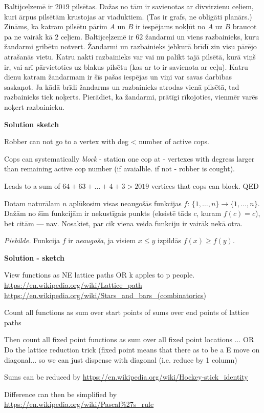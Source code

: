 \begin{problem}
Baltijceļzemē ir $2019$ pilsētas. Dažas no tām ir savienotas ar divvirzienu ceļiem, kuri ārpus pilsētām krustojas ar viaduktiem. (Tas ir grafs, ne obligāti planārs.)  
Zināms, ka katram pilsētu pārim $A$ un $B$ ir iespējams nokļūt no $A$ uz $B$ braucot pa ne vairāk kā $2$ ceļiem.
Baltijceļzemē ir $62$ žandarmi un viens razbainieks, kuru žandarmi gribētu notvert.
Žandarmi un razbainieks jebkurā brīdī zin visu pārējo atrašanās vietu.
Katru nakti razbainieks var vai nu palikt tajā pilsētā, kurā viņš ir, vai arī pārvietoties uz blakus pilsētu (kas ar to ir savienota ar ceļu).
Katru dienu katram žandarmam ir šīs pašas iespējas un viņi var savas darbības saskaņot.
Ja kādā brīdi žandarms un razbainieks atrodas vienā pilsētā, tad razbainieks tiek noķerts.
Pierādiet, ka žandarmi, prātīgi rīkojoties, vienmēr varēs noķert razbainieku.

\textbf{Solution sketch}

Robber can not go to a vertex with deg < number of active cops.

Cops can systematically \emph{block} - station one cop at -  vertexes with degress larger than remaining active cop number (if avaialble. if not - robber is cought).

Leads to a sum of $64+63+\dots+4+3>2019$ vertices that cops can block. QED

\end{problem}

\begin{problem}
Dotam naturālam $n$ aplūkosim visas neaugošās funkcijas ${f\colon\,\{1,\ldots,n\}\to\{1,\ldots,n\}}$.
Dažām no šīm funkcijām ir nekustīgais punkts (eksistē tāds $c$, kuram $f(c)=c$), bet citām --- nav. 
Nosakiet, par cik viena veida funkciju ir vairāk nekā otra.

\smallskip
\emph{Piebilde.} Funkcija \emph{$f$} ir \emph{neaugoša}, ja visiem $x \leq y$ izpildās $f(x)\geq f(y)$.

\textbf{Solution - sketch}

View functions as NE lattice paths OR k apples to p people. 
\url{https://en.wikipedia.org/wiki/Lattice_path}
\url{https://en.wikipedia.org/wiki/Stars_and_bars_(combinatorics)}

Count all functions as sum over start points of sums over end points of lattice paths

Then count all fixed point functions as sum over all fixed point locations ...
OR
Do the lattice reduction trick (fixed point means that there as to be a E move on diagonal... so we can just dispense with diagonal (i.e. reduce by 1 column)

Sums can be reduced by \url{https://en.wikipedia.org/wiki/Hockey-stick_identity}

Difference can then be simplified by \url{https://en.wikipedia.org/wiki/Pascal%27s_rule}
 
\end{problem}


